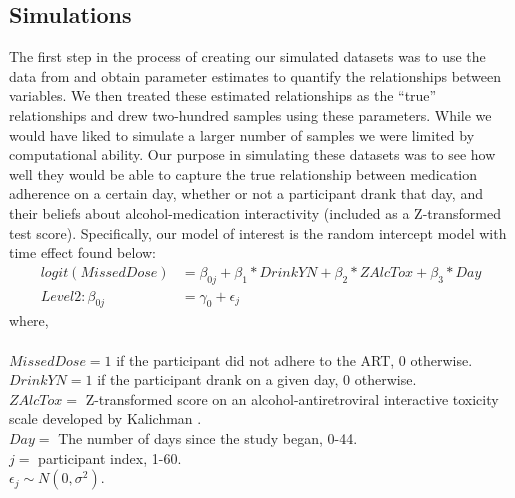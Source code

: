 \documentclass{svjour3}                     %
\begin{document}
\subsection{Simulations}
\label{sec:2.2}
The first step in the process of creating our simulated datasets was to use the data from \citet{pellowski2016alcohol} and obtain parameter estimates to quantify the relationships between variables. We then treated these estimated relationships as the “true” relationships and drew two-hundred samples using these parameters. While we would have liked to simulate a larger number of samples we were limited by computational ability. Our purpose in simulating these datasets was to see how well they would be able to capture the true relationship between medication adherence on a certain day, whether or not a participant drank that day, and their beliefs about alcohol-medication interactivity (included as a Z-transformed test score). Specifically, our model of interest is the random intercept model with time effect found below: \\

\begin{align*}
logit(MissedDose) &= \beta_{0j} + \beta_1*DrinkYN + \beta_2*ZAlcTox +\beta_3*Day \\
Level 2: \beta_{0j} &= \gamma_0 + \epsilon_j
\end{align*}
where, \\ \\
$MissedDose = 1$ if the participant did not adhere to the ART, 0 otherwise. \\
$DrinkYN = 1$ if the participant drank on a given day, 0 otherwise.\\
$ZAlcTox =$ Z-transformed score on an alcohol-antiretroviral interactive toxicity scale developed by Kalichman \cite{kalichman2009prevalence}. \\
$Day =$ The number of days since the study began, 0-44. \\
$j =$ participant index, 1-60. \\
$\epsilon_j  \sim N(0, \sigma^2)$. \\ \\
\end{document}
